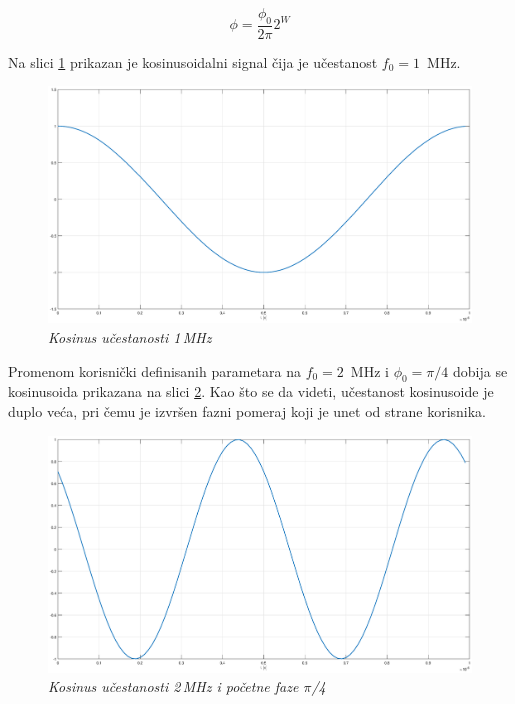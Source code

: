 \documentclass[conference]{IEEEtran}
\begin{document}
\begin{equation}
\phi = \frac{\phi_0}{2\pi} 2^W
\end{equation}

Na slici \ref{slika:kos1} prikazan je kosinusoidalni signal čija je učestanost $f_0 = 1$\, MHz. 

\begin{figure}[h]
	\centering
	\includegraphics[scale=0.15]{./slike/kos1.eps}
	\caption{\textsl{Kosinus učestanosti 1\,MHz}}
	\label{slika:kos1}
\end{figure}

Promenom korisnički definisanih parametara na $f_0 = 2$\, MHz i $\phi_0 = \pi/4$ dobija se kosinusoida prikazana na slici \ref{slika:kos2}. Kao što se da videti, učestanost kosinusoide je duplo veća, pri čemu je izvršen fazni pomeraj koji je unet od strane korisnika.

\begin{figure}[h]
	\centering
	\includegraphics[scale=0.15]{./slike/kos2.eps}
	\caption{\textsl{Kosinus učestanosti 2\,MHz i početne faze $\pi$/4}}
	\label{slika:kos2}
\end{figure}
\end{document}
